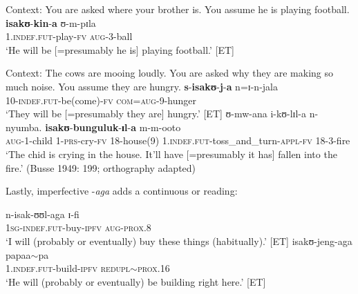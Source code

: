 \begin{exe}
\ex \label{exIsaFutEpistemic1}
Context: You are asked where your brother is. You assume he is playing football.\\
\gll \textbf{isakʊ}-\textbf{kin}-\textbf{a} ʊ-m-pɪla\\
1.\textsc{indef.fut}-play-\textsc{fv} \textsc{aug}-3-ball\\
\glt `He will be [=presumably he is] playing football.' [ET] %

\clearpage

\ex \label{exIsaFutEpistemic2}
Context: The cows are mooing loudly. You are asked why they are making so much noise. You assume they are hungry.
\gll \textbf{s}-\textbf{isakʊ}-\textbf{j}-\textbf{a} n=ɪ-n-jala\\
10-\textsc{indef.fut}-be(come)-\textsc{fv} \textsc{com}=\textsc{aug}-9-hunger\\
\glt `They will be [=presumably they are] hungry.' [ET]
\ex \label{exIsaFutEpistemic3}
\gll ʊ-mw-ana i-kʊ-lɪl-a n-nyumba. \textbf{isakʊ}-\textbf{bunguluk}-\textbf{ɪl}-\textbf{a} m-m-ooto\\
\textsc{aug}-1-child 1-\textsc{prs}-cry-\textsc{fv} 18-house(9) 1.\textsc{indef.fut}-toss\_and\_turn-\textsc{appl}-\textsc{fv} 18-3-fire\\
\glt \lq The chid is crying in the house. It'll have [=presumably it has] fallen into the fire.' (Busse 1949: 199; orthography adapted)
\end{exe}

Lastly, imperfective -\textit{aga} adds a continuous or  reading:
\begin{exe}
\ex \gll n-isak-ʊʊl-aga ɪ-fi\\
\textsc{1sg}-\textsc{indef.fut}-buy-\textsc{ipfv} \textsc{aug}-\textsc{prox.8}\\
\glt \lq I will (probably or eventually) buy these things (habitually).' [ET]
\ex \gll isakʊ-jeng-aga papaa$\sim$pa\\
1.\textsc{indef.fut}-build-\textsc{ipfv} \textsc{redupl}$\sim$\textsc{prox.16}\\
\glt \lq He will (probably or eventually) be building right here.' [ET]
\end{exe}

